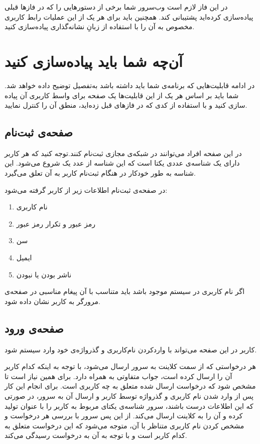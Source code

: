 \documentclass{utap}
\begin{document}
        در این فاز لازم است وب‌سرور شما برخی از دستورهایی را که در فازها قبلی پیادەسازی کردەاید پشتیبانی کند. همچنین باید برای هر یک از این عملیات رابط کاربری مخصوص به آن را با استفاده از زبانِ نشانه‌گذاری  پیادەسازی کنید.

    \section{آن‌چه‌ شما باید پیاده‌سازی کنید}
    
در ادامه قابلیت‌هایی که برنامه‌ی شما باید داشته باشد به‌تفصیل توضیح داده خواهد شد. شما باید بر اساس هر یک از این قابلیت‌ها یک صفحه برای واسط کاربری آن پیاده سازی کنید و با استفاده از کدی که در فازهای قبل زدەاید، منطق آن را کنترل نمایید.
    
    \subsection{صفحه‌ی ثبت‌نام}
    
    در این صفحه افراد می‌توانند در شبکه‌ی مجازی ثبت‌نام کنند.توجه کنید که هر کاربر دارای یک شناسه‌ی عددی یکتا است که این شناسه از عدد یک شروع می‌شود. این شناسه به طور خودکار در هنگام ثبت‌نام کاربر به آن تعلق می‌گیرد.  
    
    در صفحه‌ی ثبت‌نام اطلاعات زیر از کاربر گرفته می‌شود‌:‌
    \begin{multicols}{3}
    \begin{enumerate}
        \item نام ‌کاربری
        \item رمز عبور و تکرار رمز عبور
        \item سن
        \item ایمیل
        \item ناشر بودن یا نبودن
    \end{enumerate}
    \end{multicols}
    
    اگر نام کاربری در سیستم موجود باشد باید متناسب با آن پیغام مناسبی در صفحه‌ی مرورگر به کاربر نشان داده شود.
    
        
    \subsection{صفحه‌ی ورود}
    کاربر در این صفحه می‌تواند با واردکردن نام‌کاربری و گذرواژەی خود وارد سیستم شود. 
    
    هر درخواستی که از سمت کلاینت به سرور ارسال می‌شود، با توجه به اینکه کدام کاربر آن را ارسال کرده است، جواب متفاوتی به همراه دارد. برای همین نیاز است تا مشخص شود که درخواست ارسال شده متعلق به چه کاربری است. برای انجام این کار پس از وارد شدن نام‌ کاربری و گذرواژه توسط کاربر و ارسال آن به سرور، در صورتی که این اطلاعات درست باشند، سرور شناسه‌ی یکتای مربوط به کاربر را با عنوان  تولید کرده و آن را به کلاینت ارسال می‌کند. از این پس سرور با بررسی  هر درخواست و مشخص کردن نام کاربری متناظر با آن، متوجه می‌شود که این درخواست متعلق به کدام کاربر است و با توجه به آن به درخواست رسیدگی می‌کند.
    
\end{document}
